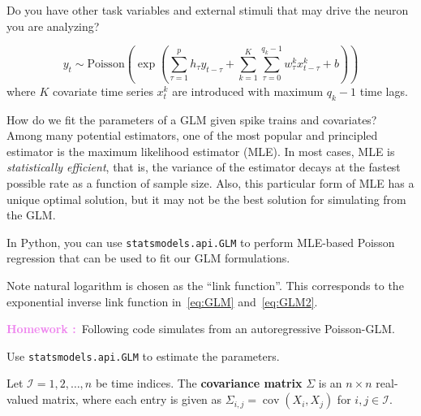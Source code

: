 \documentclass[a4paper,11pt]{exam}
\newif\ifMATLAB %
\DeclareMathOperator*{\cov}{cov}
\newcounter{homework}
\newcommand{\homework}{\stepcounter{homework}\textcolor{violet}{\textbf{Homework \thehomework:}~}}
\begin{document}
\begin{questions}
\newpage
Do you have other task variables and external stimuli that may drive the neuron you are analyzing\cite{Park2014d}?
\begin{tcolorbox}[colback=red!5!white,colframe=red!50!black,title=GLM with covariates]
\begin{equation}\label{eq:GLM2}
    y_t \sim \text{Poisson}\left(\exp\left( \sum_{\tau=1}^p h_\tau y_{t-\tau} + \sum_{k=1}^K \sum_{\tau=0}^{q_k-1} w^k_\tau x^k_{t-\tau} + b\right)\right)
\end{equation}
where $K$ covariate time series $x^k_t$ are introduced with maximum $q_k-1$ time lags.
\end{tcolorbox}
How do we fit the parameters of a GLM given spike trains and covariates?
Among many potential estimators, one of the most popular and principled estimator is the maximum likelihood estimator (MLE).
In most cases, MLE is \emph{statistically efficient}, that is, the variance of the estimator decays at the fastest possible rate as a function of sample size.
Also, this particular form of MLE has a unique optimal solution, but it may not be the best solution for simulating from the GLM\cite{Arribas2020a}.

\ifMATLAB
In MATLAB, you can use \texttt{glmfit} and \texttt{glmval} to perform MLE-based Poisson regression that can be used to fit our GLM formulations.


\else
In Python, you can use \texttt{statsmodels.api.GLM} to perform MLE-based Poisson regression that can be used to fit our GLM formulations.

%
\fi

Note natural logarithm is chosen as the ``link function''. This corresponds to the exponential inverse link function in~\eqref{eq:GLM} and~\eqref{eq:GLM2}.

\question \homework Following code simulates from an autoregressive Poisson-GLM.
\ifMATLAB
    Use \texttt{glmfit} to estimate the parameters.
    
\else
    Use \texttt{statsmodels.api.GLM} to estimate the parameters.
\fi



\newpage
\question Let $\mathcal{I} = {1, 2, \ldots, n}$ be time indices. The \textbf{covariance matrix} $\Sigma$ is an $n \times n$ real-valued matrix, where each entry is given as $\Sigma_{i,j} = \cov(X_i, X_j)$ for $i, j \in \mathcal{I}$.
\begin{parts}

\end{parts}
\end{questions}
\end{document}
